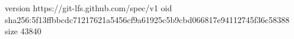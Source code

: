 version https://git-lfs.github.com/spec/v1
oid sha256:5f13ffbbcdc71217621a5456cf9a61925c5b9cbd066817e94112745f36c58388
size 43840

